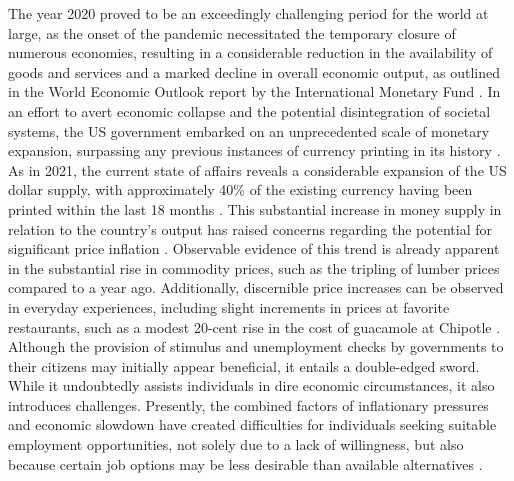 The year 2020 proved to be an exceedingly challenging period for the world at large, as the onset of the pandemic necessitated the temporary closure of numerous economies, resulting in a considerable reduction in the availability of goods and services and a marked decline in overall economic output, as outlined in the World Economic Outlook report by the International Monetary Fund \cite{imf2020}. In an effort to avert economic collapse and the potential disintegration of societal systems, the US government embarked on an unprecedented scale of monetary expansion, surpassing any previous instances of currency printing in its history \cite{blinder2020}. As in 2021, the current state of affairs reveals a considerable expansion of the US dollar supply, with approximately 40\% of the existing currency having been printed within the last 18 months \cite{fedmoneysupply}. This substantial increase in money supply in relation to the country's output has raised concerns regarding the potential for significant price inflation \cite{Blanchard2021}. Observable evidence of this trend is already apparent in the substantial rise in commodity prices, such as the tripling of lumber prices compared to a year ago. Additionally, discernible price increases can be observed in everyday experiences, including slight increments in prices at favorite restaurants, such as a modest 20-cent rise in the cost of guacamole at Chipotle \cite{BLS}. Although the provision of stimulus and unemployment checks by governments to their citizens may initially appear beneficial, it entails a double-edged sword. While it undoubtedly assists individuals in dire economic circumstances, it also introduces challenges. Presently, the combined factors of inflationary pressures and economic slowdown have created difficulties for individuals seeking suitable employment opportunities, not solely due to a lack of willingness, but also because certain job options may be less desirable than available alternatives \cite{cbo2020, kahn2020}.

